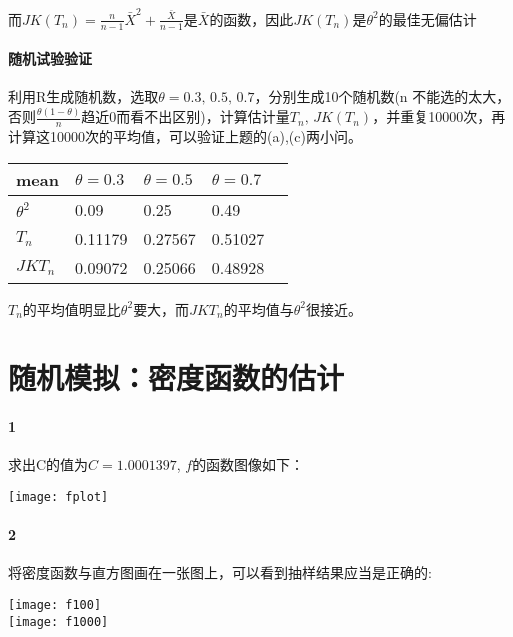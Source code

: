 \documentclass[11pt,a4paper]{ctexart}
\begin{document}
而\(\displaystyle JK(T_n) = \frac{n}{n - 1}\bar{X}^2 + \frac{\bar{X}}{n - 1}\)是\(\bar{X}\)的函数，因此\(JK(T_n)\)是\(\theta^2\)的最佳无偏估计
\paragraph{随机试验验证}
	利用R生成随机数，选取\(\theta =0.3,\, 0.5 ,\, 0.7\)，分别生成10个随机数(n 不能选的太大，否则\(\frac{\theta(1- \theta)}{n}\)趋近0而看不出区别)，计算估计量\(T_n , \,JK(T_n)\)，并重复10000次，再计算这10000次的平均值，可以验证上题的(a),(c)两小问。
	\begin{center}
		\begin{tabular}{|l|l|l|l|p{5cm}|}
			\hline
			mean & \( \theta = 0.3\) &\(\theta = 0.5 \)& \(\theta = 0.7\)\\ \hline
			\(\theta^2\) & 0.09 & 0.25 & 0.49 \\ \hline
			\(T_n\) & 0.11179 & 0.27567& 0.51027 \\ \hline
			\(JKT_n\) & 0.09072 & 0.25066 & 0.48928\\ \hline
		\end{tabular}
	\end{center}
	\(T_n\)的平均值明显比\(\theta^2\)要大，而\(JKT_n\)的平均值与\(\theta^2\)很接近。
\section{随机模拟：密度函数的估计}
\paragraph{1}
求出C的值为\(C = 1.0001397\), \(f\)的函数图像如下：
\begin{center}
	\texttt{[image: fplot]}
\end{center}
\paragraph{2}
将密度函数与直方图画在一张图上，可以看到抽样结果应当是正确的:
\begin{center}
	\texttt{[image: f100]}\\
	\texttt{[image: f1000]}
\end{center}
\end{document}
